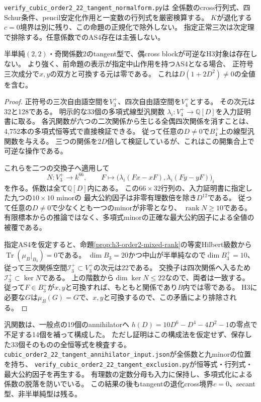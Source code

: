 \texttt{verify\_cubic\_order2\_22\_tangent\_normalform.py}は
全係数のcross行列式、四Schur条件、pencil安定化作用と一変数の行列式を厳密検算する。
$K$が退化する$c=0$境界は別に残り、この命題の正規化で除外しない。
指定正常三次は次定理で排除する。任意係数でのAS4存在は主張しない。

\begin{theorem}[tangent可逆部分の全値排除]
\label{thm:h3-order2-22-tangent-fullrank-exclusion}
半単純$(2,2)$・奇関係数2のtangent型で、偶cross blockが可逆なH3対象は存在しない。
より強く、前命題の表示が指定中山作用を持つAS4となる場合、
正符号三次成分で$x,y$の双方と可換する元は零である。
これは$D(1+2D^2)\ne0$の全値を含む。
\end{theorem}
\begin{proof}
正符号の三次自由語空間を$V_3^+$、四次自由語空間を$V_4^+$とする。
その次元は32と128である。
明示的な33個の多項式線型汎関数
$\lambda_i:V_4^+\to\mathbb Q[D]$を入力証明書に取る。
各汎関数が六つの二次関係から生じる全偶四次関係を消すことは、
4,752本の多項式恒等式で直接検証できる。
従って任意の$D\ne0$で$B_4^+$上の線型汎関数を与える。
三つの関係を$2D$倍して検証しているが、これはこの開集合上で可逆な操作である。

これらを二つの交換子へ適用して
\[
 N:V_3^+\longrightarrow k^{66},\qquad
 F\longmapsto\bigl(\lambda_i(Fx-xF),\lambda_i(Fy-yF)\bigr)_i
\]
を作る。係数は全て$\mathbb Q[D]$内にある。
この$66\times32$行列の、入力証明書に指定した九つの$10\times10$ minorの
最大公約因子は非零有理数倍を除き$D^{12}$である。
従って任意の$D\ne0$で少なくとも一つのminorが非零となり、
$\operatorname{rank}N\ge10$である。
有限標本からの推論ではなく、多項式minorの正確な最大公約因子による全値の被覆である。

指定AS4を仮定すると、命題\ref{prop:h3-order2-mixed-rank}の等変Hilbert級数から
$\operatorname{Tr}(\mu_B|_{B_3})=0$である。
$\dim B_3=20$かつ中山が半単純なので$\dim B_3^+=10$、
従って三次関係空間$\mathcal I_3^+\subset V_3^+$の次元は22である。
交換子は四次関係へ入るため$\mathcal I_3^+\subset\ker N$である。
上の階数から$\dim\ker N\le22$なので、両者は一致する。
従って$F\in B_3^+$が$x,y$と可換すれば、もともと関係であり$B$内では零である。
H3に必要な$G$は$\mu_B(G)=G$で、$x,y$と可換するので、この矛盾により排除される。
\end{proof}

汎関数は、一般点の19個のannihilatorへ
$h(D)=10D^6-D^4-4D^2-1$の零点で不足する14個を補って構成した。
ただし証明はこの構成法を仮定せず、保存した33個そのものの全恒等式を検査する。
\texttt{cubic\_order2\_22\_tangent\_annihilator\_input.json}が全係数と九minorの位置を持ち、
\texttt{verify\_cubic\_order2\_22\_tangent\_exclusion.py}が恒等式・行列式・最大公約因子を再生する。
有理数の定数分母も入力に保持し、多項式化による係数の脱落を防いでいる。
この結果の後もtangentの退化cross境界$c=0$、secant型、非半単純型は残る。

